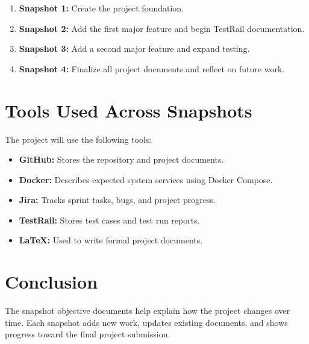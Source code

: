 \documentclass[12pt]{article}
\begin{document}
\begin{enumerate}
    \item \textbf{Snapshot 1:} Create the project foundation.
    \item \textbf{Snapshot 2:} Add the first major feature and begin TestRail documentation.
    \item \textbf{Snapshot 3:} Add a second major feature and expand testing.
    \item \textbf{Snapshot 4:} Finalize all project documents and reflect on future work.
\end{enumerate}

\section{Tools Used Across Snapshots}

The project will use the following tools:

\begin{itemize}
    \item \textbf{GitHub:} Stores the repository and project documents.
    \item \textbf{Docker:} Describes expected system services using Docker Compose.
    \item \textbf{Jira:} Tracks sprint tasks, bugs, and project progress.
    \item \textbf{TestRail:} Stores test cases and test run reports.
    \item \textbf{LaTeX:} Used to write formal project documents.
\end{itemize}

\section{Conclusion}

The snapshot objective documents help explain how the project changes over time. Each snapshot adds new work, updates existing documents, and shows progress toward the final project submission.
\end{document}
